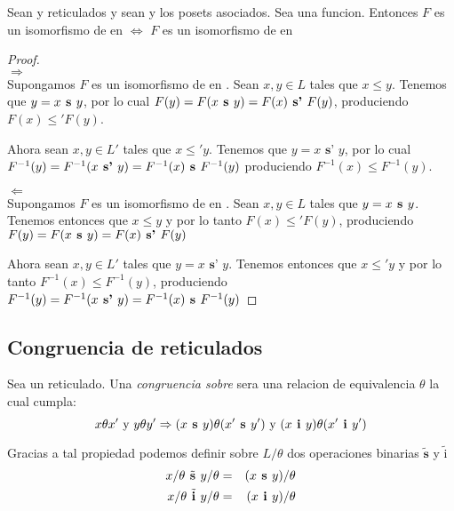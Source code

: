 \begin{lemma}
  Sean \reticulAlg y  reticulados y sean  y 
  los posets asociados. Sea  una funcion. Entonces $F$ es un isomorfismo de
  \reticulAlg en  $\iff$ $F$ es un isomorfismo de  en 
\end{lemma}
\begin{proof}
  ${}$\\
  $\Rightarrow$\\
  Supongamos $F$ es un isomorfismo de \reticulAlg en . Sean $x, y \in L$ tales que $x \leq y$.
  Tenemos que $y = x\textbf{ s }y$, por lo cual $F(y) = F(x\textbf{ s }y) = F(x) \textbf{ s' }F(y)$, produciendo $F(x) \leq' F(y)$.
  
  Ahora sean $x, y \in L'$ tales que $x \leq' y$. Tenemos que $y = x \textbf{ s' } y$, por lo cual $F^{-1}(y) = F^{-1}(x \textbf{ s' }y) = F^{-1}(x)\textbf{ s }F^{-1}(y)$
  produciendo $F^{-1}(x) \leq F^{-1}(y)$.

  $\Leftarrow$\\
  Supongamos $F$ es un isomorfismo de  en . Sean $x, y \in L$ tales que $y = x\textbf{ s }y$. Tenemos entonces
  que $x \leq y$ y por lo tanto $F(x) \leq' F(y)$, produciendo $F(y) = F(x\textbf{ s }y) = F(x) \textbf{ s' }F(y)$

  Ahora sean $x, y \in L'$ tales que $y = x \textbf{ s' } y$. Tenemos entonces que $x\leq'y$ y por lo tanto $F^{-1}(x) \leq F^{-1}(y)$, produciendo
  $F^{-1}(y) = F^{-1}(x \textbf{ s' }y) = F^{-1}(x)\textbf{ s }F^{-1}(y)$

\end{proof}

\subsection{Congruencia de reticulados}

\begin{definition}
  Sea \reticulAlg un reticulado. Una \emph{congruencia sobre} \reticulAlg sera una relacion de equivalencia
  $\theta$ la cual cumpla:
  $$
  x\theta x' \text{ y } y\theta y' \Rightarrow (x\textbf{ s }y)\theta(x'\textbf{ s }y') \text{ y } (x\textbf{ i }y)\theta(x'\textbf{ i }y')
  $$

  Gracias a tal propiedad podemos definir sobre $L/\theta$ dos operaciones binarias $\tilde{\textbf{s}}$ y $\tilde{\text{i}}$
  \begin{alignat*}{2}
    x/\theta\tilde{\textbf{ s }}y/\theta &=& (x\textbf{ s }y)/\theta\\
    x/\theta\tilde{\textbf{ i }}y/\theta &=& (x\textbf{ i }y)/\theta
  \end{alignat*}
\end{definition}

